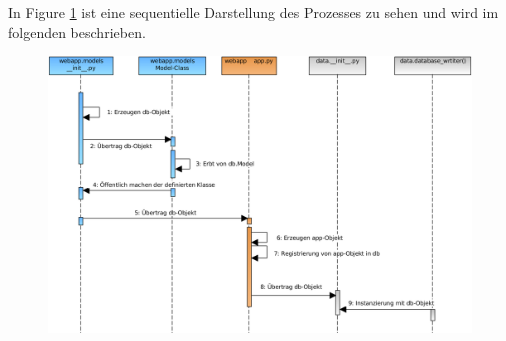 In Figure \ref{fig:sequenzSQLALCHEMY} ist eine sequentielle Darstellung des Prozesses zu sehen und wird im folgenden beschrieben. 

\begin{figure}[H]
 \centering
 \includegraphics[width=\textwidth]{pix/seq_db.png}
 \label{fig:sequenzSQLALCHEMY}
\end{figure}


